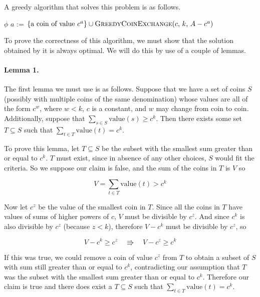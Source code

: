 \documentclass{article}
\begin{document}
A greedy algorithm that solves this problem is as follows.

\begin{algorithm}
	\begin{algorithmic}
		\Return \(\phi\)
		\EndIf
		\State \(a\) := 
		\State \Return \(\{\text{a coin of value } c^a\} \cup \text{\Call{GreedyCoinExchange}{$c$, $k$, $A - c^a$}}\)
		\EndFunction
	\end{algorithmic}
\end{algorithm}

To prove the correctness of this algorithm, we must show that the solution obtained by it is always optimal. We will do this by use of a couple of lemmas.

\paragraph{Lemma 1.} The first lemma we must use is as follows. Suppose that we have a set of coins \(S\) (possibly with multiple coins of the same denomination) whose values are all of the form \(c^w\), where \(w<k\), \(c\) is a constant, and \(w\) may change from coin to coin. Additionally, suppose that \(\sum_{s \in S}\text{value}(s) \geq c^k\). Then there exists some set \(T \subseteq S\) such that \(\sum_{t \in T}\text{value}(t) = c^k\).

To prove this lemma, let \(T \subseteq S\) be the subset with the smallest sum greater than or equal to \(c^k\). \(T\) must exist, since in absence of any other choices, \(S\) would fit the criteria. So we suppose our claim is false, and the sum of the coins in \(T\) is \(V\) so

\[V = \sum_{t \in T} \text{value} (t) > c^k\]

Now let \(c^z\) be the value of the smallest coin in \(T\). Since all the coins in \(T\) have values of sums of higher powers of \(c\), \(V\) must be divisible by \(c^z\). And since \(c^k\) is also divisible by \(c^z\) (because \(z < k\)), therefore \(V - c^k\) must be divisible by \(c^z\), so

\[V - c^k \geq c^z \quad \Rrightarrow \quad V - c^z \geq c^k\]

If this was true, we could remove a coin of value \(c^z\) from \(T\) to obtain a subset of \(S\) with sum still greater than or equal to \(c^k\), contradicting our assumption that \(T\) was the subset with the smallest sum greater than or equal to \(c^k\). Therefore our claim is true and there does exist a \(T \subseteq S\) such that \(\sum_{t \in T}\text{value}(t) = c^k\).
\end{document}
